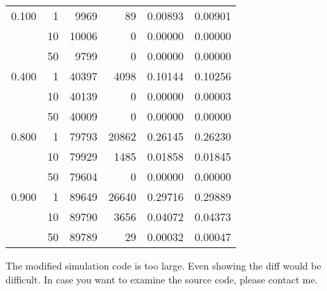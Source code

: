 \begin{enumerate}
\begin{table}[t]
\begin{tabular}{rrrrrr}
                  \multicolumn{1}{l}{0.100}             & 1  & 9969  & 89    & 0.00893 & 0.00901 \\
                                                        & 10 & 10006 & 0     & 0.00000 & 0.00000 \\
                                                        & 50 & 9799  & 0     & 0.00000 & 0.00000 \\
                  \midrule
                  \multicolumn{1}{l}{0.400}             & 1  & 40397 & 4098  & 0.10144 & 0.10256 \\
                                                        & 10 & 40139 & 0     & 0.00000 & 0.00003 \\
                                                        & 50 & 40009 & 0     & 0.00000 & 0.00000 \\
                  \midrule
                  \multicolumn{1}{l}{0.800}             & 1  & 79793 & 20862 & 0.26145 & 0.26230 \\
                                                        & 10 & 79929 & 1485  & 0.01858 & 0.01845 \\
                                                        & 50 & 79604 & 0     & 0.00000 & 0.00000 \\
                  \midrule
                  \multicolumn{1}{l}{0.900}             & 1  & 89649 & 26640 & 0.29716 & 0.29889 \\
                                                        & 10 & 89790 & 3656  & 0.04072 & 0.04373 \\
                                                        & 50 & 89789 & 29    & 0.00032 & 0.00047 \\
                  \bottomrule
              \end{tabular}
          \end{table}

          The modified simulation code is too large.
          Even showing the diff would be difficult.
          In case you want to examine the source code, please contact me.

\end{enumerate}
